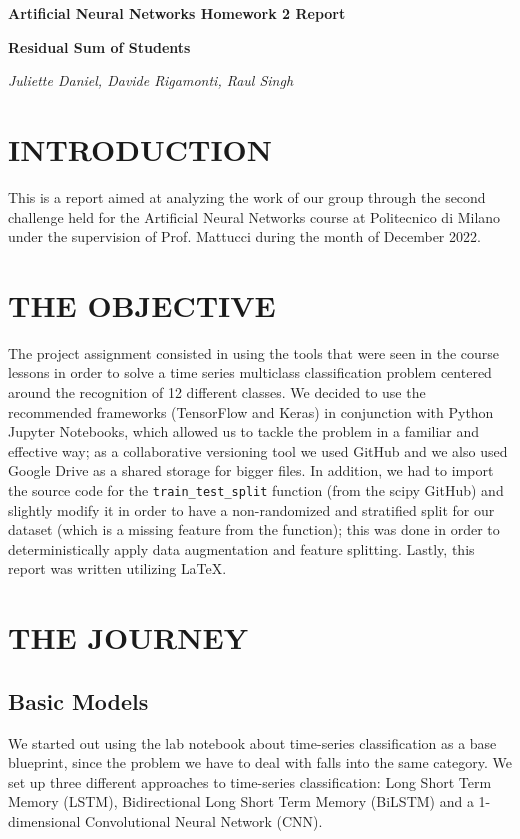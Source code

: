 \documentclass[11pt]{report}
\begin{document}
\begin{titlepage}
    \centering
    {\Large\bfseries Artificial Neural Networks Homework 2 Report \par}
    {\normalsize\bfseries Residual Sum of Students \par}
    {\normalsize\textit{Juliette Daniel, Davide Rigamonti, Raul Singh} \par}
\end{titlepage}

\section{INTRODUCTION}
This is a report aimed at analyzing the work of our group through the second challenge held for the Artificial Neural Networks course at Politecnico di Milano under the supervision of Prof. Mattucci during the month of December 2022.

\section{THE OBJECTIVE}
The project assignment consisted in using the tools that were seen in the course lessons in order to solve a time series multiclass classification problem centered around the recognition of 12 different classes.
We decided to use the recommended frameworks (TensorFlow and Keras) in conjunction with Python Jupyter Notebooks, which allowed us to tackle the problem in a familiar and effective way; as a collaborative versioning tool we used GitHub and we also used Google Drive as a shared storage for bigger files.
In addition, we had to import the source code for the \texttt{train\_test\_split} function (from the scipy GitHub) and slightly modify it in order to have a non-randomized and stratified split for our dataset (which is a missing feature from the function); this was done in order to deterministically apply data augmentation and feature splitting.
Lastly, this report was written utilizing {\selectfont \LaTeX}.

\section{THE JOURNEY}

\subsection{Basic Models}
We started out using the lab notebook about time-series classification as a base blueprint, since the problem we have to deal with falls into the same category.
We set up three different approaches to time-series classification: Long Short Term Memory (LSTM), Bidirectional Long Short Term Memory (BiLSTM) and a 1-dimensional Convolutional Neural Network (CNN).
\end{document}
